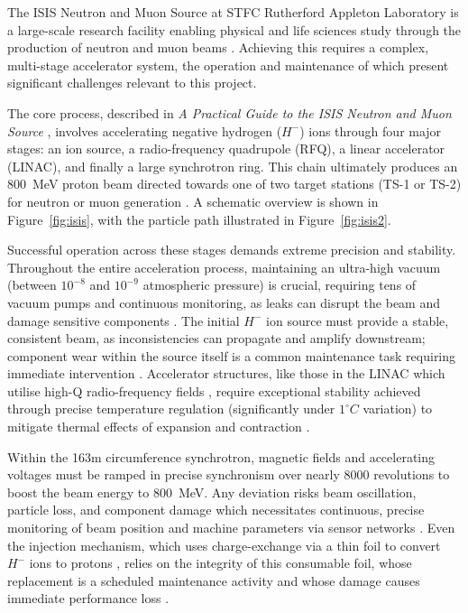 \documentclass[10pt,oneside]{report}
\begin{document}

The ISIS Neutron and Muon Source at STFC Rutherford Appleton Laboratory is a large-scale research facility enabling physical and life sciences study through the production of neutron and muon beams \cite{thomason2019isis}. Achieving this requires a complex, multi-stage accelerator system, the operation and maintenance of which present significant challenges relevant to this project.

The core process, described in \textit{A Practical Guide to the ISIS Neutron and Muon Source} \cite{2021practicalguide}, involves accelerating negative hydrogen ($H^-$) ions through four major stages: an ion source, a radio-frequency quadrupole (RFQ), a linear accelerator (LINAC), and finally a large synchrotron ring. This chain ultimately produces an 800~MeV proton beam directed towards one of two target stations (TS-1 or TS-2) for neutron or muon generation \cite{2021practicalguide}. A schematic overview is shown in Figure~\ref{fig:isis}, with the particle path illustrated in Figure~\ref{fig:isis2}.

Successful operation across these stages demands extreme precision and stability. Throughout the entire acceleration process, maintaining an ultra-high vacuum (between $10^{-8}$ and $10^{-9}$ atmospheric pressure) is crucial, requiring tens of vacuum pumps and continuous monitoring, as leaks can disrupt the beam and damage sensitive components \cite{2021practicalguide}. The initial $H^-$ ion source must provide a stable, consistent beam, as inconsistencies can propagate and amplify downstream; component wear within the source itself is a common maintenance task requiring immediate intervention \cite{2021practicalguide}. Accelerator structures, like those in the LINAC which utilise high-Q radio-frequency fields \cite{michael2006electronic}, require exceptional stability achieved through precise temperature regulation (significantly under $1^\circ C$ variation) to mitigate thermal effects of expansion and contraction \cite{2021practicalguide}.

Within the 163m circumference synchrotron, magnetic fields and accelerating voltages must be ramped in precise synchronism over nearly 8000 revolutions to boost the beam energy to 800~MeV. Any deviation risks beam oscillation, particle loss, and component damage which necessitates continuous, precise monitoring of beam position and machine parameters via sensor networks \cite{2021practicalguide}. Even the injection mechanism, which uses charge-exchange via a thin foil to convert $H^-$ ions to protons \cite{2021practicalguide, ankenbrandt1980h}, relies on the integrity of this consumable foil, whose replacement is a scheduled maintenance activity and whose damage causes immediate performance loss \cite{2021practicalguide}.
\end{document}
